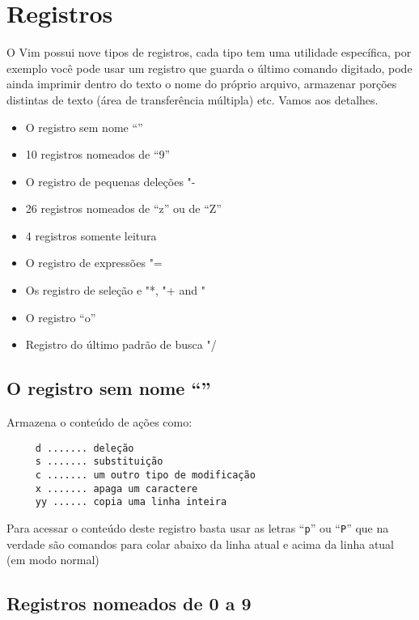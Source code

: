 
\chapter{Registros}
\label{Registros}

O Vim possui nove tipos de registros, cada tipo tem uma utilidade específica,
por exemplo você pode usar um registro que guarda o último comando digitado,
pode ainda imprimir dentro do texto o nome do próprio arquivo, armazenar
porções distintas de texto (área de transferência múltipla) etc. Vamos aos
detalhes.

\begin{itemize}
   \item O registro sem nome ``''
   \item 10 registros nomeados de ``9''
   \item O registro de pequenas deleções "-
   \item 26 registros nomeados de ``z'' ou de ``Z''
   \item 4 registros somente leitura
   \item O registro de expressões "=
   \item Os registro de seleção e  "*, "+ and "~
   \item O registro ``o''
   \item Registro do último padrão de busca "/
\end{itemize}

\section{O registro sem nome ``''}
\label{O registro sem nome ``''}

Armazena o conteúdo de ações como:

\begin{verbatim}
     d ....... deleção
     s ....... substituição
     c ....... um outro tipo de modificação
     x ....... apaga um caractere
     yy ...... copia uma linha inteira
\end{verbatim}

Para acessar o conteúdo deste registro basta usar as letras ``{\tt p}'' ou ``{\tt P}'' que
na verdade são comandos para colar abaixo da linha atual e acima da
linha atual (em modo normal)

\section{Registros nomeados de 0 a 9}
\label{Registros nomeados de 0 a 9}

